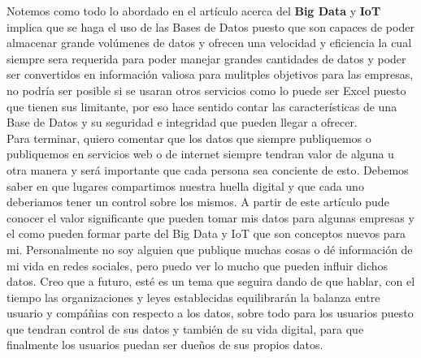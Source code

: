\documentclass[12pt]{report}
\begin{document}
\begin{enumerate}[label=\textbf{\arabic*.}, leftmargin=*]
\begin{enumerate}[label=\textbf{\alph*.}, leftmargin=*, itemsep=1.0em]
Notemos como todo lo abordado en el artículo acerca del \textbf{Big Data} y \textbf{IoT} implica que se haga el uso de las Bases de Datos puesto que son capaces de poder almacenar grande volúmenes de datos y ofrecen una velocidad y eficiencia la cual siempre sera requerida para poder manejar grandes cantidades de datos y poder ser convertidos en información valiosa para mulitples objetivos para las empresas, no podría ser posible si se usaran otros servicios como lo puede ser Excel puesto que tienen sus limitante, por eso hace sentido contar las características de una Base de Datos y su seguridad e integridad que pueden llegar a ofrecer. \\

Para terminar, quiero comentar que los datos que siempre publiquemos o publiquemos en servicios web o de internet siempre tendran valor de alguna u otra manera y será importante que cada persona sea conciente de esto. Debemos saber en que lugares compartimos nuestra huella digital y que cada uno deberiamos tener un control sobre los mismos. A partir de este artículo pude conocer el valor significante que pueden tomar mis datos para algunas empresas y el como pueden formar parte del Big Data y IoT que son conceptos nuevos para mi. Personalmente no soy alguien que publique muchas cosas o dé información de mi vida en redes sociales, pero puedo ver lo mucho que pueden influir dichos datos. Creo que a futuro, esté es un tema que seguira dando de que hablar, con el tiempo las organizaciones y leyes establecidas equilibrarán la balanza entre usuario y compáñias con respecto a los datos, sobre todo para los usuarios puesto que tendran control de sus datos y también de su vida digital, para que finalmente los usuarios puedan ser dueños de sus propios datos. 
\end{enumerate}

\end{enumerate}
\end{document}
